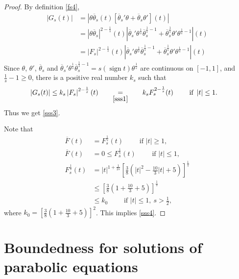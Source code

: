 \documentclass[11pt, a4paper]{article}
\numberwithin{equation}{section}
\newcommand{\coex}[2][\hphantom{longexplanation}]{%
  \underset{{#1}}{\overset{\hphantom{longexplanation}}{#2}}
}
\newcommand{\abs}[1]{\left\lvert #1\right\rvert}
\DeclareMathOperator{\sign}{{sign}}
\begin{document}
\begin{proof}
By definition \eqref{fs4},
\begin{align*}
  \abs{G_{s}(t)}
  &=\abs{\theta\overline{\theta}_{s}(t)
    \left[\overline{\theta}_{s}'\theta+\overline{\theta}_{s}\theta'
    \right](t)}\\
  &= \abs{\theta\overline{\theta}_{s}}^{2-\frac{1}{s}}(t)
    \abs{\overline{\theta}_{s}'\theta^{\frac{1}{s}}\overline{\theta}_{s}^{\frac{1}{s}-1}+\overline{\theta}_{s}^{\frac{1}{s}}\theta'\theta^{\frac{1}{s}-1}}(t)\\
  &= \abs{F_s}^{2-\frac{1}{s}}(t)
    \abs{\overline{\theta}_{s}'\theta^{\frac{1}{s}}\overline{\theta}_{s}^{\frac{1}{s}-1}+\overline{\theta}_{s}^{\frac{1}{s}}\theta'\theta^{\frac{1}{s}-1}}(t)
\end{align*}
 Since  $\theta$, $\theta'$, $\overline{\theta}_{s}$ and
  $\overline{\theta}_{s}'\theta^{\frac{1}{s}}\overline{\theta}_{s}^{\frac{1}{s}-1}
  = s \left( \sign t \right) \theta^{\frac{1}{s}}$ are continuous on $[-1,1]$, and $\frac{1}{s}-1\ge 0$, there is a positive real number $k_{s}$ such that
\begin{align*}
  \abs{G_s(t)}
  &\le k_s \abs{F_s}^{2-\frac{1}{s}}(t)
    \coex[\eqref{sss1}]{=} k_s F_s^{2-\frac{1}{s}}(t) \qquad \text{ if } \abs{t} \le 1.
\end{align*}
Thus we get \eqref{sss3}.

Note that
\begin{align*}
  \overline{F}(t)
  &= F_{s}^{\frac{1}{s}}(t)\qquad \text{ if } \abs{t}\ge 1,\\
  \overline{F}(t)
  &=0\le F_{s}^{\frac{1}{s}}(t)\qquad \text{ if } \abs{t}\le 1,\\
  F_{s}^{\frac{1}{s}} (t)
  &=  \abs{t}^{1+\frac{1}{2s}} \left[\frac{3}{8}
    \left(\abs{t}^{2}-\frac{10}{3}\abs{t} +5 \right)
    \right]^{\frac{1}{s}}\\
  &\le \left[\frac{3}{8} \left(1+\frac{10}{3} +5 \right)
    \right]^{\frac{1}{s}}\\
  &\le{k_{0}}\qquad \text{ if } \abs{t}\le 1,~ s>\frac{1}{2},
\end{align*}
where $k_{0}= \left[\frac{3}{8} \left(1+\frac{10}{3} +5 \right) \right]^{2}$. This implies \eqref{sss4}.
\end{proof}
\section{Boundedness for  solutions of parabolic equations}\label{bo}
\end{document}
